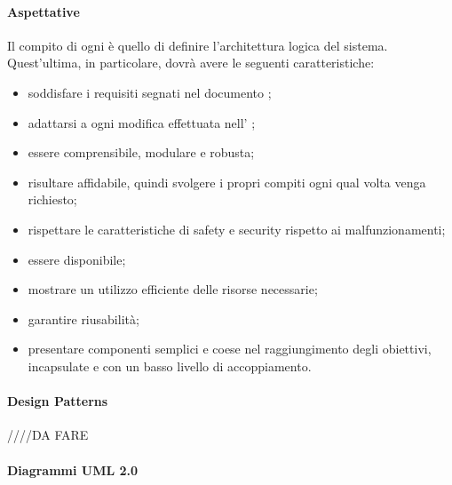 \paragraph{Aspettative}

Il compito di ogni \prog{} è quello di definire l'architettura logica del sistema. Quest'ultima, in particolare, dovrà avere le seguenti caratteristiche:
\begin{itemize}

\item soddisfare i requisiti segnati nel documento \AdR{};

\item adattarsi a ogni modifica effettuata nell' \AdR{};

\item essere comprensibile, modulare e robusta;

\item risultare affidabile, quindi svolgere i propri compiti ogni qual volta venga richiesto;

\item rispettare le caratteristiche di safety e security rispetto ai malfunzionamenti;

\item essere disponibile;

\item mostrare un utilizzo efficiente delle risorse necessarie;

\item garantire riusabilità;

\item presentare componenti semplici e coese nel raggiungimento degli obiettivi, incapsulate e con un basso livello di accoppiamento.

\end{itemize}

\paragraph{Design Patterns}

////DA FARE

\paragraph{Diagrammi UML 2.0}

